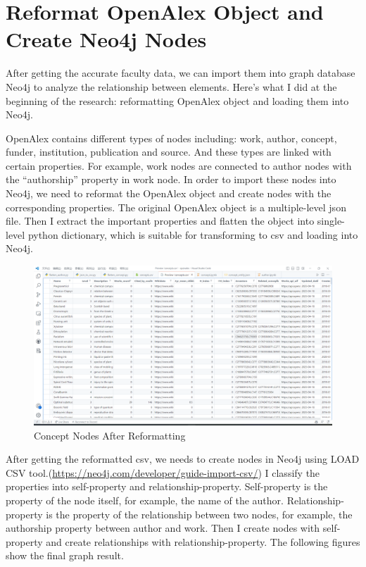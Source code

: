 \documentclass[../report.tex]{subfiles}
\begin{document}
\section{Reformat OpenAlex Object and Create Neo4j Nodes}
\hspace{0.5cm} After getting the accurate faculty data, we can import them into graph database Neo4j to analyze the relationship between elements. Here's what I did at the beginning of the research: reformatting OpenAlex object and loading them into Neo4j. 
\par OpenAlex contains different types of nodes including: work, author, concept, funder, institution, publication and source. And these types are linked with certain properties. For example, work nodes are connected to author nodes with the ``authorship'' property in work node. In order to import these nodes into Neo4j, we need to reformat the OpenAlex object and create nodes with the corresponding properties. The original OpenAlex object is a multiple-level json file. Then I extract the important properties and flatten the object into single-level python dictionary, which is suitable for transforming to csv and loading into Neo4j. 

\begin{figure}[htbp]
    \centering
    \includegraphics[width=1\textwidth]{./figs/reformat_example.png}
    \caption{Concept Nodes After Reformatting}
    \label{reformat_example}
  \end{figure}

\hspace{0.5cm} After getting the reformatted csv, we needs to create nodes in Neo4j using LOAD CSV tool.(\url{https://neo4j.com/developer/guide-import-csv/}) I classify the properties into self-property and relationship-property. Self-property is the property of the node itself, for example, the name of the author. Relationship-property is the property of the relationship between two nodes, for example, the authorship property between author and work. Then I create nodes with self-property and create relationships with relationship-property. The following figures show the final graph result.
\end{document}
